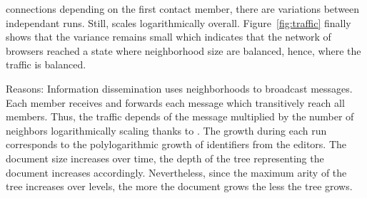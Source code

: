 \begin{asparadesc}
  connections depending on the first contact member, there are variations
  between independant runs. Still, \SPRAY scales logarithmically
  overall. Figure~\ref{fig:traffic} finally shows that the variance remains
  small which indicates that the network of browsers reached a state where
  neighborhood size are balanced, hence, where the traffic is balanced.
\item [Reasons:] Information dissemination uses neighborhoods to broadcast
  messages. Each member receives and forwards each message which transitively
  reach all members. Thus, the traffic depends of the message multiplied by the
  number of neighbors logarithmically scaling thanks to \SPRAY. The growth
  during each run corresponds to the polylogarithmic growth of identifiers from
  the editors. The document size increases over time, the depth of the \LSEQ
  tree representing the document increases accordingly. Nevertheless, since the
  maximum arity of the tree increases over levels, the more the document grows
  the less the tree grows.
\end{asparadesc}
